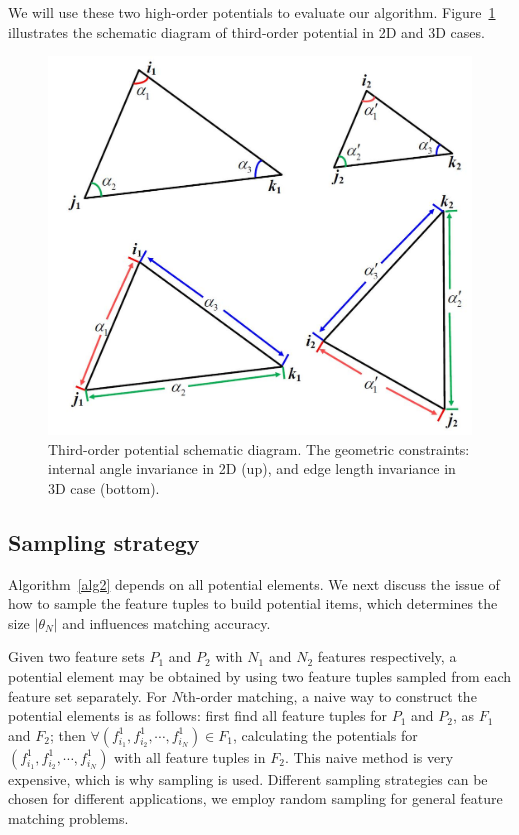 We will use these two high-order potentials to evaluate our algorithm.
Figure~\ref{fig:TO} illustrates the schematic diagram of third-order potential in 2D and 3D cases.

\begin{figure}
\centering
  \includegraphics[width=0.8\linewidth]{figures/diagram.jpg}
  \caption{Third-order potential schematic diagram. The geometric constraints: internal angle invariance in 2D (up), and edge length invariance in 3D case (bottom).}
\label{fig:TO}
\end{figure}

\subsection{Sampling strategy}
\label{subsec:sampling}

Algorithm~\ref{alg2} depends on all potential elements.
We next discuss the issue of how to sample the feature tuples to build potential items, which determines the size $|\theta_N|$ and influences matching accuracy.

Given two feature sets $P_1$ and $P_2$ with $N_1$ and $N_2$ features respectively,
a potential element may be obtained by using two feature tuples sampled from each feature set separately.
For $N$th-order matching, a naive way to construct the potential elements is as follows:
first find all feature tuples for $P_1$ and $P_2$, as $F_1$ and $F_2$; then $\forall (f_{i_1}^1, f_{i_2}^1, \cdots, f_{i_N}^1)\in F_1$,
calculating the potentials for $(f_{i_1}^1, f_{i_2}^1, \cdots, f_{i_N}^1)$ with all feature tuples in $F_2$.
This naive method is very expensive, which is why sampling is used.
Different sampling strategies can be chosen for different applications,
we employ random sampling for general feature matching problems.

